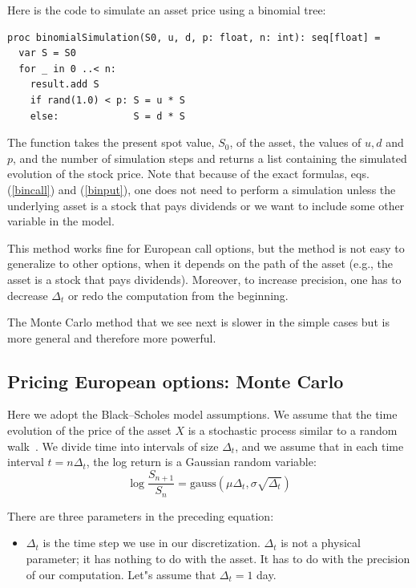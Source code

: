 \documentclass[justified, sixbynine]{tufte-book}
\theoremstyle{plain}%
\newtheorem * {corollary}{Corollary}
\theoremstyle{definition}
\theoremstyle{remark}
\newtheorem * {remark}{Remark}
\newtheorem * {note}{Note}
\begin{document}
\begin{fullwidth}
Here is the code to simulate an asset price using a binomial tree:
\begin{lstlisting}
proc binomialSimulation(S0, u, d, p: float, n: int): seq[float] =
  var S = S0
  for _ in 0 ..< n:
    result.add S
    if rand(1.0) < p: S = u * S
    else:             S = d * S
\end{lstlisting}

The function takes the present spot value, $S_0$, of the asset, the values
of $u, d$ and $p$, and the number of simulation steps and returns a list
containing the simulated evolution of the stock price. Note that because of
the exact formulas, eqs.(\ref{bincall}) and (\ref{binput}), one does not need
to perform a simulation unless the underlying asset is a stock that pays
dividends or we want to include some other variable in the model.

This method works fine for European call options, but the method is not easy to
generalize to other options, when it depends on the path of
the asset (e.g., the asset is a stock that pays dividends). Moreover, 
to increase precision, one has to decrease $\Delta _t$ or redo the
computation from the beginning.

The Monte Carlo method that we see next is slower in the simple cases but is
more general and therefore more powerful.

\goodbreak\subsection{Pricing European options: Monte Carlo}

Here we adopt the Black--Scholes model assumptions.
We assume that the time evolution of the price of the asset $X$ is
a stochastic process similar to a random walk~\cite{shreve}. We divide time into
intervals of size $\Delta _t$, and we assume that in each time interval $%
t=n\Delta _t$, the log return is a Gaussian random variable:
\begin{equation}
\log \frac{S_{n+1}}{S_n} = \textrm{gauss}(\mu\Delta_t, \sigma\sqrt{\Delta_t}) \label{BS}
\end{equation}

There are three parameters in the preceding equation:

\begin{itemize}
\item  $\Delta _t$ is the time step we use in our discretization. $\Delta _t$
is not a physical parameter; it has nothing to do with the asset. It has to
do with the precision of our computation. Let"s assume that $\Delta _t=1$ day.


\end{itemize}
\end{fullwidth}
\end{document}
